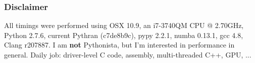 \documentclass[aspectratio=1610]{beamer}
\begin{document}
\begin{frame}[fragile]
    \frametitle{Disclaimer}

All timings were performed using OSX 10.9, an i7-3740QM CPU @ 2.70GHz, Python 2.7.6, current Pythran (c7de8b9c), pypy 2.2.1, numba 0.13.1, gcc 4.8, Clang r207887.
\vfill
I am \textbf{not} Pythonista, but I'm interested in performance in general. 
Daily job: driver-level C code, assembly, multi-threaded C++, GPU, ...
\vfill
{}
\vfill
{}
\end{frame}
\end{document}
